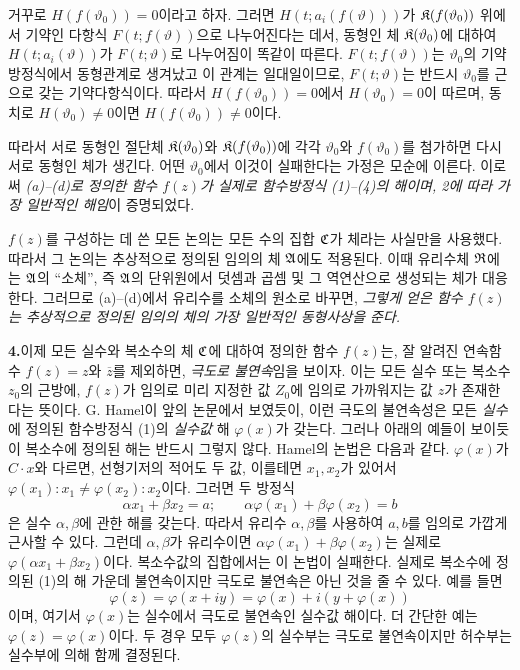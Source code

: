 거꾸로 \(H(f(\vartheta_0))=0\)이라고 하자. 그러면 \(H(t;a_i(f(\vartheta)))\)가 \(\mathfrak K(f(\vartheta_0))\) 위에서 기약인 다항식 \(F(t;f(\vartheta))\)으로 나누어진다는 데서, 동형인 체 \(\mathfrak K(\vartheta_0)\)에 대하여 \(H(t;a_i(\vartheta))\)가 \(F(t;\vartheta)\)로 나누어짐이 똑같이 따른다. \(F(t;f(\vartheta))\)는 \(\vartheta_0\)의 기약방정식에서 동형관계로 생겨났고 이 관계는 일대일이므로, \(F(t;\vartheta)\)는 반드시 \(\vartheta_0\)를 근으로 갖는 기약다항식이다. 따라서 \(H(f(\vartheta_0))=0\)에서 \(H(\vartheta_0)=0\)이 따르며, 동치로 \(H(\vartheta_0)\ne0\)이면 \(H(f(\vartheta_0))\ne0\)이다.

따라서 서로 동형인 절단체 \(\mathfrak K(\vartheta_0)\)와 \(\mathfrak K(f(\vartheta_0))\)에 각각 \(\vartheta_0\)와 \(f(\vartheta_0)\)를 첨가하면 다시 서로 동형인 체가 생긴다. 어떤 \(\vartheta_0\)에서 이것이 실패한다는 가정은 모순에 이른다. 이로써 \emph{(a)--(d)로 정의한 함수 \(f(z)\)가 실제로 함수방정식 (1)--(4)의 해이며, 2에 따라 가장 일반적인 해임}이 증명되었다.

\(f(z)\)를 구성하는 데 쓴 모든 논의는 모든 수의 집합 \(\mathfrak C\)가 체라는 사실만을 사용했다. 따라서 그 논의는 추상적으로 정의된 임의의 체 \(\mathfrak A\)에도 적용된다. 이때 유리수체 \(\mathfrak R\)에는 \(\mathfrak A\)의 ``소체'', 즉 \(\mathfrak A\)의 단위원에서 덧셈과 곱셈 및 그 역연산으로 생성되는 체가 대응한다. 그러므로 (a)--(d)에서 유리수를 소체의 원소로 바꾸면, \emph{그렇게 얻은 함수 \(f(z)\)는 추상적으로 정의된 임의의 체의 가장 일반적인 동형사상을 준다.}

\medskip
\noindent\textbf{4.}\quad 이제 모든 실수와 복소수의 체 \(\mathfrak C\)에 대하여 정의한 함수 \(f(z)\)는, 잘 알려진 연속함수 \(f(z)=z\)와 \(\overline z\)를 제외하면, \emph{극도로 불연속}임을 보이자. 이는 모든 실수 또는 복소수 \(z_0\)의 근방에, \(f(z)\)가 임의로 미리 지정한 값 \(Z_0\)에 임의로 가까워지는 값 \(z\)가 존재한다는 뜻이다. G. Hamel이 앞의 논문에서 보였듯이, 이런 극도의 불연속성은 모든 \emph{실수}에 정의된 함수방정식 (1)의 \emph{실수값} 해 \(\varphi(x)\)가 갖는다. 그러나 아래의 예들이 보이듯이 복소수에 정의된 해는 반드시 그렇지 않다. Hamel의 논법은 다음과 같다. \(\varphi(x)\)가 \(C\cdot x\)와 다르면, 선형기저의 적어도 두 값, 이를테면 \(x_1,x_2\)가 있어서 \(\varphi(x_1):x_1\ne\varphi(x_2):x_2\)이다. 그러면 두 방정식
\[
\alpha x_1+\beta x_2=a;\qquad \alpha\varphi(x_1)+\beta\varphi(x_2)=b
\]
은 실수 \(\alpha,\beta\)에 관한 해를 갖는다. 따라서 유리수 \(\alpha,\beta\)를 사용하여 \(a,b\)를 임의로 가깝게 근사할 수 있다. 그런데 \(\alpha,\beta\)가 유리수이면 \(\alpha\varphi(x_1)+\beta\varphi(x_2)\)는 실제로 \(\varphi(\alpha x_1+\beta x_2)\)이다. 복소수값의 집합에서는 이 논법이 실패한다. 실제로 복소수에 정의된 (1)의 해 가운데 불연속이지만 극도로 불연속은 아닌 것을 줄 수 있다. 예를 들면
\[
\varphi(z)=\varphi(x+iy)=\varphi(x)+i(y+\varphi(x))
\]
이며, 여기서 \(\varphi(x)\)는 실수에서 극도로 불연속인 실수값 해이다. 더 간단한 예는 \(\varphi(z)=\varphi(x)\)이다. 두 경우 모두 \(\varphi(z)\)의 실수부는 극도로 불연속이지만 허수부는 실수부에 의해 함께 결정된다.

